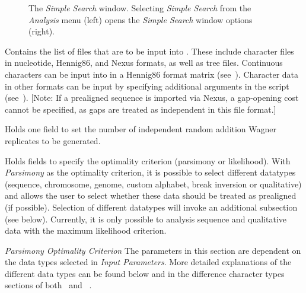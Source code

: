 \begin{figure}
\begin{minipage}[c]{0.52\textwidth}
\end{minipage}

\caption{The \emph{Simple Search} window. Selecting \emph{Simple Search} from the \emph{Analysis} 
menu (left) opens the \emph{Simple Search} window options (right).}
\label{fig:simple_search_window}
\end{figure}

\begin{description}
\setlength{\parindent}{0.5cm}
\item[Input Files]
Contains the list of files that are to be input into \poy. These include
character files in nucleotide, Hennig86, and Nexus formats, as well as tree files. 
Continuous characters can be input into \poy in a Hennig86 format matrix (see~).
Character data in other formats can be input by specifying additional arguments in the script (see~).
[Note: If a prealigned sequence is imported via Nexus, a gap-opening cost cannot be specified, 
as gaps are treated as independent in this file format.]

\item[Search Parameters]
Holds one field to set the number of independent random addition Wagner replicates to be generated.

\item[Input Parameters]
Holds fields to specify the optimality criterion (parsimony or likelihood).  With \emph{Parsimony} 
as the optimality criterion, it is possible to select different datatypes (sequence, chromosome, genome, 
custom alphabet, break inversion or qualitative) and allows the user to select whether these data 
should be treated as prealigned (if possible). Selection of different datatypes will invoke an additional 
subsection (see below).  Currently, it is only possible to analysis sequence and qualitative data with 
the maximum likelihood criterion.
\end{description}   

\hangindent=1cm	\emph{Parsimony Optimality Criterion}
The parameters in this section are dependent on the data types selected 
in \emph{Input Parameters}. More detailed explanations of the different data types can be found 
below and  in the difference character types sections of both~ and ~.


